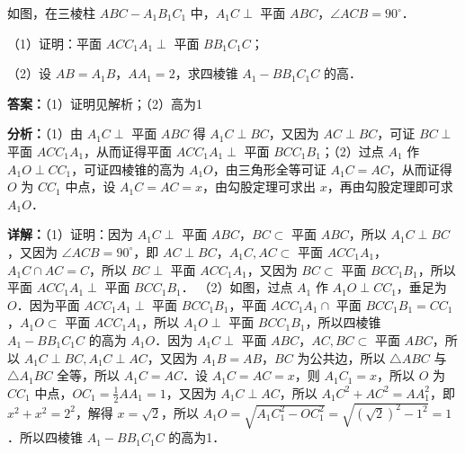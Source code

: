 \begin{question}
如图，在三棱柱 $ABC-A_1B_1C_1$ 中，$A_1C\perp$ 平面 $ABC$，$\angle ACB=90^\circ$．

（1）证明：平面 $ACC_1A_1\perp$ 平面 $BB_1C_1C$；

（2）设 $AB=A_1B$，$AA_1=2$，求四棱锥 $A_1-BB_1C_1C$ 的高．
\begin{solution}
\textbf{答案：}（1）证明见解析；（2）高为1

\textbf{分析：}（1）由 $A_1C\perp$ 平面 $ABC$ 得 $A_1C\perp BC$，又因为 $AC\perp BC$，可证 $BC\perp$ 平面 $ACC_1A_1$，从而证得平面 $ACC_1A_1\perp$ 平面 $BCC_1B_1$；（2）过点 $A_1$ 作 $A_1O\perp CC_1$，可证四棱锥的高为 $A_1O$，由三角形全等可证 $A_1C=AC$，从而证得 $O$ 为 $CC_1$ 中点，设 $A_1C=AC=x$，由勾股定理可求出 $x$，再由勾股定理即可求 $A_1O$．

\textbf{详解：}（1）证明：因为 $A_1C\perp$ 平面 $ABC$，$BC\subset$ 平面 $ABC$，所以 $A_1C\perp BC$，又因为 $\angle ACB=90^\circ$，即 $AC\perp BC$，$A_1C, AC\subset$ 平面 $ACC_1A_1$，$A_1C\cap AC=C$，所以 $BC\perp$ 平面 $ACC_1A_1$，又因为 $BC\subset$ 平面 $BCC_1B_1$，所以平面 $ACC_1A_1\perp$ 平面 $BCC_1B_1$．
（2）如图，过点 $A_1$ 作 $A_1O\perp CC_1$，垂足为 $O$．因为平面 $ACC_1A_1\perp$ 平面 $BCC_1B_1$，平面 $ACC_1A_1\cap$ 平面 $BCC_1B_1=CC_1$，$A_1O\subset$ 平面 $ACC_1A_1$，所以 $A_1O\perp$ 平面 $BCC_1B_1$，所以四棱锥 $A_1-BB_1C_1C$ 的高为 $A_1O$．因为 $A_1C\perp$ 平面 $ABC$，$AC, BC\subset$ 平面 $ABC$，所以 $A_1C\perp BC, A_1C\perp AC$，又因为 $A_1B=AB$，$BC$ 为公共边，所以 $\triangle ABC$ 与 $\triangle A_1BC$ 全等，所以 $A_1C=AC$．设 $A_1C=AC=x$，则 $A_1C_1=x$，所以 $O$ 为 $CC_1$ 中点，$OC_1=\frac{1}{2}AA_1=1$，又因为 $A_1C\perp AC$，所以 $A_1C^2+AC^2=AA_1^2$，即 $x^2+x^2=2^2$，解得 $x=\sqrt{2}$，所以 $A_1O=\sqrt{A_1C_1^2-OC_1^2}=\sqrt{(\sqrt{2})^2-1^2}=1$．所以四棱锥 $A_1-BB_1C_1C$ 的高为1．
\end{solution}
\end{question}

